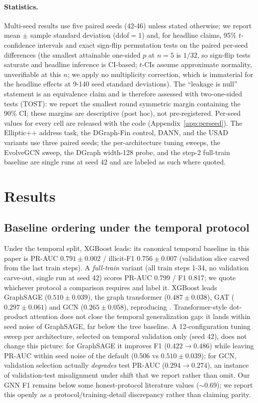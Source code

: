 \documentclass{article}
\begin{document}
\paragraph{Statistics.} Multi-seed results use five paired seeds (42-46) unless
stated otherwise; we report mean $\pm$ sample standard deviation (ddof$=1$) and,
for headline claims, 95\% $t$-confidence intervals and exact sign-flip permutation
tests on the paired per-seed differences (the smallest attainable one-sided $p$ at
$n{=}5$ is $1/32$, so sign-flip tests saturate and headline inference is CI-based;
$t$-CIs assume approximate normality, unverifiable at this $n$; we apply no
multiplicity correction, which is immaterial for the headline effects at 9-140
seed standard deviations). The ``leakage is null'' statement is an equivalence claim and
is therefore assessed with two-one-sided tests (TOST): we report the smallest
round symmetric margin containing the 90\% CI; these margins are descriptive
(post hoc), not pre-registered. Per-seed values for every cell are released with
the code (Appendix~\ref{app:perseed}). The Elliptic++ address task, the
DGraph-Fin control, DANN, and the USAD variants use three paired seeds; the
per-architecture tuning sweeps, the EvolveGCN sweep, the DGraph width-128 probe,
and the step-2 full-train baseline are single runs at seed 42 and are labeled as
such where quoted.

\section{Results}
\subsection{Baseline ordering under the temporal protocol}
Under the temporal split, XGBoost leads: its canonical temporal baseline in this
paper is PR-AUC $0.791\pm0.002$ / illicit-F1 $0.756\pm0.007$ (validation slice
carved from the last train steps). A \emph{full-train} variant (all train steps
1-34, no validation carve-out, single run at seed 42) scores PR-AUC 0.799 / F1
0.817; we quote whichever protocol a comparison requires and label it. XGBoost
leads GraphSAGE ($0.510\pm0.039$), the graph
transformer ($0.487\pm0.038$), GAT ($0.297\pm0.061$) and GCN ($0.265\pm0.058$),
reproducing \citet{weber2019aml}. Transformer-style dot-product attention does
not close the temporal generalization gap: it lands within seed noise of
GraphSAGE, far below the tree baseline. A
12-configuration tuning sweep per architecture, selected on temporal validation
only (seed 42), does not change this picture: for GraphSAGE it improves F1
($0.422 \rightarrow 0.486$) while leaving PR-AUC within seed noise of the default
(0.506 vs $0.510\pm0.039$); for GCN, validation selection actually \emph{degrades}
test PR-AUC ($0.294 \rightarrow 0.274$), an instance of validation-test
misalignment under shift that we report rather than omit. Our GNN F1 remains below
some honest-protocol literature values ($\sim$0.69); we report this openly as a
protocol/training-detail discrepancy rather than claiming parity.
\end{document}
